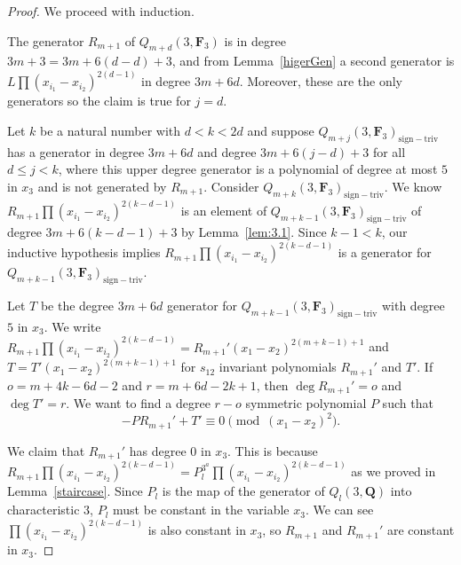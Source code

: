 \documentclass[11pt]{article}
\numberwithin{equation}{section}
\theoremstyle{definition}
\numberwithin{equation}{section}
\newcommand{\siv}{\mathrm{sign-triv}}
\begin{document}
\begin{proof} We proceed with induction.

 The generator $R_{m+1}$ of $Q_{m+d}(3,\mathbf{F}_3)$ is in degree $3m+3=3m+6(d-d)+3$, and from Lemma~\ref{higerGen} a second generator is $L\prod(x_{i_1}-x_{i_2})^{2(d-1)}$ in degree $3m+6d$. Moreover, these are the only generators so the claim is true for $j=d$.

 Let $k$ be a natural number with $d<k<2d$ and suppose $Q_{m+j}(3,\mathbf{F}_3)_{\siv}$ has a generator in degree $3m+6d$ and degree $3m+6(j-d)+3$ for all $d\leq j < k$, where this upper degree generator is a polynomial of degree at most $5$ in $x_3$ and is not generated by $R_{m+1}$. Consider $Q_{m+k}(3,\mathbf{F}_3)_{\siv}$. We know $R_{m+1}\prod(x_{i_1}-x_{i_2})^{2(k-d-1)}$ is an element of $Q_{m+k-1}(3,\mathbf{F}_3)_{\siv}$ of degree $3m+6(k-d-1)+3$ by Lemma~\ref{lem:3.1}. Since $k-1<k$, our inductive hypothesis implies $R_{m+1}\prod(x_{i_1}-x_{i_2})^{2(k-d-1)}$ is a generator for $Q_{m+k-1}(3,\mathbf{F}_3)_{\siv}$.

 Let $T$ be the degree $3m+6d$ generator for $Q_{m+k-1}(3,\mathbf{F}_3)_{\siv}$ with degree $5$ in $x_3$. We write $R_{m+1}\prod(x_{i_1}-x_{i_2})^{2(k-d-1)} = R_{m+1}'(x_1-x_2)^{2(m+k-1)+1}$ and $T=T'(x_1-x_2)^{2(m+k-1)+1}$ for $s_{12}$ invariant polynomials $R_{m+1}'$ and $T'$. If $o = m+4k-6d-2$ and $r = m+6d-2k+1$, then $\deg R_{m+1}' =o$ and $\deg T' = r$. We want to find a degree $r-o$ symmetric polynomial $P$ such that
 \[-PR_{m+1}'+T'\equiv 0 \pmod{(x_1-x_2)^2}.\]

 We claim that $R_{m+1}'$ has degree $0$ in $x_3$. This is because $R_{m+1}\prod (x_{i_1}-x_{i_2})^{2(k-d-1)}=P_l^{3^a}\prod (x_{i_1}-x_{i_2})^{2(k-d-1)}$ as we proved in Lemma~\ref{staircase}. Since $P_l$ is the map of the generator of $Q_l(3,\mathbf{Q})$ into characteristic $3$, $P_l$ must be constant in the variable $x_3$. We can see ${\prod (x_{i_1}-x_{i_2})^{2(k-d-1)}}$ is also constant in $x_3$, so $R_{m+1}$ and $R_{m+1}'$ are constant in $x_3$.


\end{proof}
\end{document}
